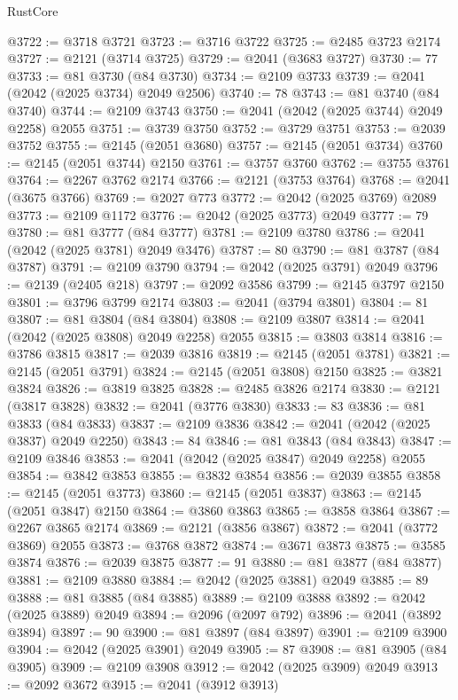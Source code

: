 \begin{lexlean}{RustCore}
\begin{coremodule}
@3722 := @3718 @3721
@3723 := @3716 @3722
@3725 := @2485 @3723 @2174
@3727 := @2121 (@3714 @3725)
@3729 := @2041 (@3683 @3727)
@3730 := 77
@3733 := @81 @3730 (@84 @3730)
@3734 := @2109 @3733
@3739 := @2041 (@2042 (@2025 @3734) @2049 @2506)
@3740 := 78
@3743 := @81 @3740 (@84 @3740)
@3744 := @2109 @3743
@3750 := @2041 (@2042 (@2025 @3744) @2049 @2258) @2055
@3751 := @3739 @3750
@3752 := @3729 @3751
@3753 := @2039 @3752
@3755 := @2145 (@2051 @3680)
@3757 := @2145 (@2051 @3734)
@3760 := @2145 (@2051 @3744) @2150
@3761 := @3757 @3760
@3762 := @3755 @3761
@3764 := @2267 @3762 @2174
@3766 := @2121 (@3753 @3764)
@3768 := @2041 (@3675 @3766)
@3769 := @2027 @773
@3772 := @2042 (@2025 @3769) @2089
@3773 := @2109 @1172
@3776 := @2042 (@2025 @3773) @2049
@3777 := 79
@3780 := @81 @3777 (@84 @3777)
@3781 := @2109 @3780
@3786 := @2041 (@2042 (@2025 @3781) @2049 @3476)
@3787 := 80
@3790 := @81 @3787 (@84 @3787)
@3791 := @2109 @3790
@3794 := @2042 (@2025 @3791) @2049
@3796 := @2139 (@2405 @218)
@3797 := @2092 @3586
@3799 := @2145 @3797 @2150
@3801 := @3796 @3799 @2174
@3803 := @2041 (@3794 @3801)
@3804 := 81
@3807 := @81 @3804 (@84 @3804)
@3808 := @2109 @3807
@3814 := @2041 (@2042 (@2025 @3808) @2049 @2258) @2055
@3815 := @3803 @3814
@3816 := @3786 @3815
@3817 := @2039 @3816
@3819 := @2145 (@2051 @3781)
@3821 := @2145 (@2051 @3791)
@3824 := @2145 (@2051 @3808) @2150
@3825 := @3821 @3824
@3826 := @3819 @3825
@3828 := @2485 @3826 @2174
@3830 := @2121 (@3817 @3828)
@3832 := @2041 (@3776 @3830)
@3833 := 83
@3836 := @81 @3833 (@84 @3833)
@3837 := @2109 @3836
@3842 := @2041 (@2042 (@2025 @3837) @2049 @2250)
@3843 := 84
@3846 := @81 @3843 (@84 @3843)
@3847 := @2109 @3846
@3853 := @2041 (@2042 (@2025 @3847) @2049 @2258) @2055
@3854 := @3842 @3853
@3855 := @3832 @3854
@3856 := @2039 @3855
@3858 := @2145 (@2051 @3773)
@3860 := @2145 (@2051 @3837)
@3863 := @2145 (@2051 @3847) @2150
@3864 := @3860 @3863
@3865 := @3858 @3864
@3867 := @2267 @3865 @2174
@3869 := @2121 (@3856 @3867)
@3872 := @2041 (@3772 @3869) @2055
@3873 := @3768 @3872
@3874 := @3671 @3873
@3875 := @3585 @3874
@3876 := @2039 @3875
@3877 := 91
@3880 := @81 @3877 (@84 @3877)
@3881 := @2109 @3880
@3884 := @2042 (@2025 @3881) @2049
@3885 := 89
@3888 := @81 @3885 (@84 @3885)
@3889 := @2109 @3888
@3892 := @2042 (@2025 @3889) @2049
@3894 := @2096 (@2097 @792)
@3896 := @2041 (@3892 @3894)
@3897 := 90
@3900 := @81 @3897 (@84 @3897)
@3901 := @2109 @3900
@3904 := @2042 (@2025 @3901) @2049
@3905 := 87
@3908 := @81 @3905 (@84 @3905)
@3909 := @2109 @3908
@3912 := @2042 (@2025 @3909) @2049
@3913 := @2092 @3672
@3915 := @2041 (@3912 @3913)

\end{coremodule}
\end{lexlean}
